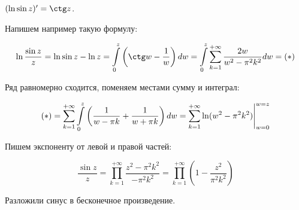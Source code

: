 \begin{example}
    $(\ln \sin z)' = \ctg z$.

    Напишем например такую формулу:

    \[
        \ln \frac{\sin z}{z}
        = \ln \sin z - \ln z
        = \int\limits_0^{z}
        \left(\ctg w - \frac{1}w\right)dw
        = \int\limits_0^z \sum\limits_{k=1}^{+\infty}
        \frac{2w}{w^2-\pi^2k^2}dw = (*)
    \]

    Ряд равномерно сходится, поменяем местами сумму и интеграл:

    \[
        (*) =
        \sum\limits_{k=1}^{+\infty}
        \int\limits_0^z \left(\frac{1}{w-\pi k} + \frac{1}{w+\pi k}\right)
        dw = \sum\limits_{k=1}^{+\infty}
        \eval{\ln (w^2-\pi^2k^2)}_{w = 0}^{w = z}
    \]

    Пишем экспоненту от левой и правой частей:

    \[
        \frac{\sin z}{z} = \prod_{k=1}^{+\infty}
        \frac{z^2-\pi^2k^2}{-\pi^2k^2}
        = \prod_{k=1}^{+\infty} \left(1 - \frac{z^2}{\pi^2 k^2}\right)
    \]

    Разложили синус в бесконечное произведение.
\end{example}

\newpage

